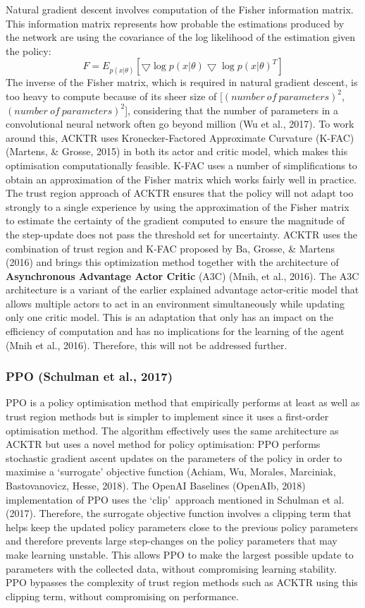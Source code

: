 Natural gradient descent involves computation of the Fisher information matrix. This information matrix represents how probable the estimations produced by the network are using the covariance of the log likelihood of the estimation given the policy: 
\[ F = E_{p(x|\theta)}[\bigtriangledown \log p(x|\theta) \bigtriangledown \log p(x|\theta)^{T}] \]
The inverse of the Fisher matrix, which is required in natural gradient descent, is too heavy to compute because of its sheer size of [$(number \ of \ parameters)^{2}$, $(number \ of \ parameters)^{2}$], considering that the number of parameters in a convolutional neural network often go beyond million (Wu et al., 2017). To work around this, ACKTR uses Kronecker-Factored Approximate Curvature (K-FAC) (Martens, \& Grosse, 2015) in both its actor and critic model, which makes this optimisation computationally feasible. K-FAC uses a number of simplifications to obtain an approximation of the Fisher matrix which works fairly well in practice. The trust region approach of ACKTR ensures that the policy will not adapt too strongly to a single experience by using the approximation of the Fisher matrix to estimate the certainty of the gradient computed to ensure the magnitude of the step-update does not pass the threshold set for uncertainty. ACKTR uses the combination of trust region and K-FAC proposed by Ba, Grosse, \& Martens (2016) and brings this optimization method together with the architecture of \textbf{Asynchronous Advantage Actor Critic} (A3C) (Mnih, et al., 2016). The A3C architecture is a variant of the earlier explained advantage actor-critic model that allows multiple actors to act in an environment simultaneously while updating only one critic model. This is an adaptation that only has an impact on the efficiency of computation and has no implications for the learning of the agent (Mnih et al., 2016). Therefore, this will not be addressed further.

\subsubsection*{PPO (Schulman et al., 2017)}
PPO is a policy optimisation method that empirically performs at least as well as trust region methods but is simpler to implement since it uses a first-order optimisation method. The algorithm effectively uses the same architecture as ACKTR but uses a novel method for policy optimisation: PPO performs stochastic gradient ascent updates on the parameters of the policy in order to maximise a ‘surrogate’ objective function (Achiam, Wu, Morales, Marciniak, Bastovanovicz, Hesse, 2018). The OpenAI Baselines (OpenAIb, 2018) implementation of PPO uses the \lq clip\rq \ approach mentioned in Schulman et al. (2017). Therefore, the surrogate objective function involves a clipping term that helps keep the updated policy parameters close to the previous policy parameters and therefore prevents large step-changes on the policy parameters that may make learning unstable. This allows PPO to make the largest possible update to parameters with the collected data, without compromising learning stability. PPO bypasses the complexity of trust region methods such as ACKTR using this clipping term, without compromising on performance.

